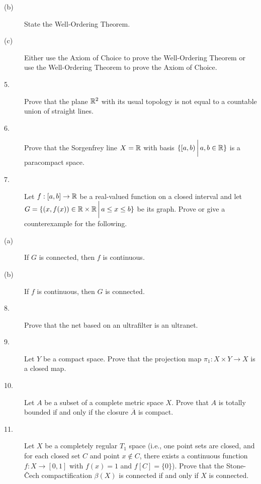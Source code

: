 \documentclass[bbb]{report}
\def\R{{\Bbb R}}
\begin{document}
\begin{large}
\begin{description}
\vspace{.1in}
\item[\quad (b)] State the Well-Ordering Theorem.

\vspace{.1in}
\item[\quad (c)] Either use the Axiom of Choice to prove the
Well-Ordering Theorem or use the Well-Ordering Theorem to prove the
Axiom of Choice.

\vspace{.5in}
\item[5.] Prove that the plane ${\Bbb R}^2$ with its usual
topology is not equal to a countable union of straight lines.

\vspace{.5in}
\item[6.]
Prove that the Sorgenfrey line $X={\Bbb R}$ with basis
$\{[a,b)\,\bigg|\,a,b\in{\Bbb R}\}$ is a paracompact space.

\vspace{.5in}
\item[7.]
Let $f:[a,b]\to{\Bbb R}$ be a real-valued function on a
closed interval and let
$G=\{(x,f(x))\in{\Bbb R}\times\R
\,\bigg|\, a\leq x\leq b\}$ be its graph.
Prove or give a counterexample for the following.

\vspace{.1in}
\item[\quad (a)] If $G$ is connected, then $f$ is continuous.

\vspace{.25in}
\item[\quad (b)] If $f$ is continuous, then $G$ is connected.


\vspace{.5in}
\item[8.]
Prove that the net based on an ultrafilter is an ultranet.

\vspace{.5in}
\item[9.]
Let $Y$ be a compact space. Prove that the projection map
$\pi_1:X\times Y\to X$ is a closed map.

\vspace{.5in}
\item[10.]
Let $A$ be a subset of a complete metric space $X$.
Prove that $A$ is totally bounded if and only if the closure
$\overline{A}$ is compact.

\vspace{.5in}
\item[11.]
Let $X$ be a completely regular $T_1$ space
(i.e., one point sets are closed, and for each closed set $C$
and point $x\not\in C$, there exists a continuous function
$f:X\to[0,1]$ with $f(x)=1$ and $f[C]=\{0\}$).
Prove that the Stone-\v Cech compactification $\beta(X)$ is
connected if and only if $X$ is connected.


\end{description}
\end{large}
\end{document}
